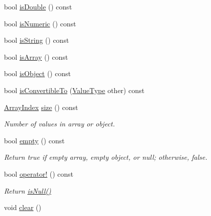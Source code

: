 \begin{DoxyCompactItemize}
bool \hyperlink{classJson_1_1Value_a4a2e2a790e19a1c09fc5dd12d7ad47b5_a4a2e2a790e19a1c09fc5dd12d7ad47b5}{is\+Double} () const
\item 
bool \hyperlink{classJson_1_1Value_af961a000cd203c895e44c195ab39b866_af961a000cd203c895e44c195ab39b866}{is\+Numeric} () const
\item 
bool \hyperlink{classJson_1_1Value_a71e1f82cf1c3eaf969d400dcffb163a6_a71e1f82cf1c3eaf969d400dcffb163a6}{is\+String} () const
\item 
bool \hyperlink{classJson_1_1Value_a1627eb9d6568d6d0252fa8bb711c0a59_a1627eb9d6568d6d0252fa8bb711c0a59}{is\+Array} () const
\item 
bool \hyperlink{classJson_1_1Value_a8cf96c0f2a552051fcfc78ffee60e037_a8cf96c0f2a552051fcfc78ffee60e037}{is\+Object} () const
\item 
bool \hyperlink{classJson_1_1Value_af1ee6be27a96a7d12128efdd60deb54d_af1ee6be27a96a7d12128efdd60deb54d}{is\+Convertible\+To} (\hyperlink{namespaceJson_a7d654b75c16a57007925868e38212b4e_a7d654b75c16a57007925868e38212b4e}{Value\+Type} other) const
\item 
\hyperlink{classJson_1_1Value_a184a91566cccca7b819240f0d5561c7d_a184a91566cccca7b819240f0d5561c7d}{Array\+Index} \hyperlink{classJson_1_1Value_a0ec2808e1d7efa4e9fad938d6667be44_a0ec2808e1d7efa4e9fad938d6667be44}{size} () const
\begin{DoxyCompactList}\small\item\em Number of values in array or object. \end{DoxyCompactList}\item 
bool \hyperlink{classJson_1_1Value_a0519a551e37ee6665d74742b3f96bab3_a0519a551e37ee6665d74742b3f96bab3}{empty} () const
\begin{DoxyCompactList}\small\item\em Return true if empty array, empty object, or null; otherwise, false. \end{DoxyCompactList}\item 
bool \hyperlink{classJson_1_1Value_a731b89fb4764c39ce2328e1707c822b9_a731b89fb4764c39ce2328e1707c822b9}{operator!} () const
\begin{DoxyCompactList}\small\item\em Return \hyperlink{classJson_1_1Value_abde4070e21e46dc4f8203f66582cb19f_abde4070e21e46dc4f8203f66582cb19f}{is\+Null()} \end{DoxyCompactList}\item 
void \hyperlink{classJson_1_1Value_a501a4d67e6c875255c2ecc03ccd2019b_a501a4d67e6c875255c2ecc03ccd2019b}{clear} ()

\end{DoxyCompactItemize}
